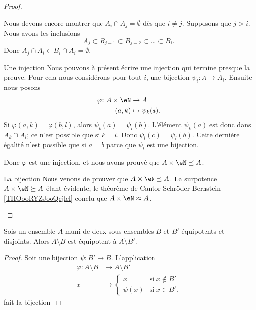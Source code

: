 \begin{proof}
\begin{subproof}
            Nous devons encore montrer que \( A_i\cap A_j=\emptyset\) dès que \( i\neq j\). Supposons que \( j>i\). Nous avons les inclusions
            \begin{equation}
                A_j\subset B_{j-1}\subset B_{j-2}\subset \ldots \subset B_i.
            \end{equation}
            Donc \( A_j\cap A_i\subset B_i\cap A_i=\emptyset\).
        \item[Une injection]
            Nous pouvons à présent écrire une injection qui termine presque la preuve. Pour cela nous considérons pour tout \( i\), une bijection \( \psi_i\colon A\to A_i\). Ensuite nous posons
            \begin{equation}
                \begin{aligned}
                    \varphi\colon A\times \eN&\to A \\
                    (a,k)&\mapsto \psi_k(a). 
                \end{aligned}
            \end{equation}
                Si \( \varphi(a,k)=\varphi(b,l)\), alors \( \psi_k(a)=\psi_l(b)\). L'élément \( \psi_k(a)\) est donc dans \( A_k\cap A_l\); ce n'est possible que si \( k=l\). Donc \( \psi_l(a)=\psi_l(b)\). Cette dernière égalité n'est possible que si \( a=b\) parce que \( \psi_l\) est une bijection.
            
                Donc \( \varphi\) est une injection, et nous avons prouvé que \( A\times \eN\preceq A\).
            \item[La bijection]
                Nous venons de prouver que \( A\times \eN\preceq A\). La surpotence \( A\times \eN\succeq A\) étant évidente, le théorème de Cantor-Schröder-Bernstein \ref{THOooRYZJooQcjlcl} conclu que \( A\times \eN\approx A\).
    \end{subproof}
\end{proof}

\begin{lemma}        \label{LEMooDHWSooFqhano}
    Sois un ensemble \( A\) muni de deux sous-ensembles \( B\) et \( B'\) équipotents et disjoints. Alors \( A\setminus B\) est équipotent à \( A\setminus B'\).
\end{lemma}

\begin{proof}
    Soit une bijection \( \psi\colon B'\to B\). L'application
    \begin{equation}
        \begin{aligned}
            \varphi\colon A\setminus B&\to A\setminus B' \\
            x&\mapsto \begin{cases}
                x    &   \text{si } x\notin B'\\
                \psi(x)    &    \text{si } x\in B'.
            \end{cases}
        \end{aligned}
    \end{equation}
    fait la bijection.
\end{proof}

